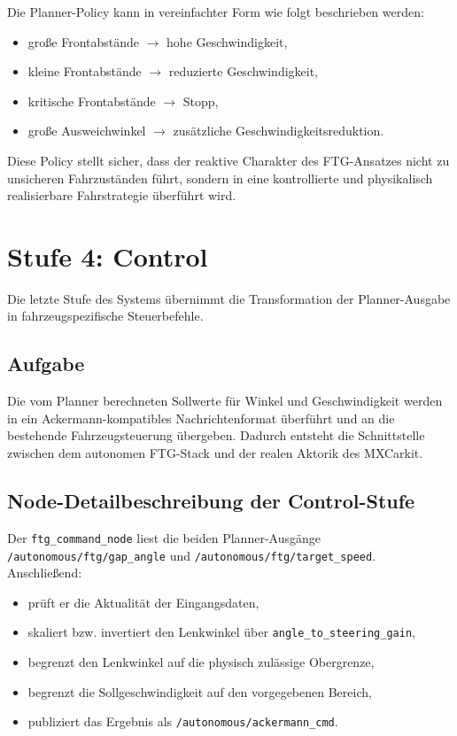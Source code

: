 Die Planner-Policy kann in vereinfachter Form wie folgt beschrieben werden:

\begin{itemize}
    \item große Frontabstände $\rightarrow$ hohe Geschwindigkeit,
    \item kleine Frontabstände $\rightarrow$ reduzierte Geschwindigkeit,
    \item kritische Frontabstände $\rightarrow$ Stopp,
    \item große Ausweichwinkel $\rightarrow$ zusätzliche Geschwindigkeitsreduktion.
\end{itemize}

Diese Policy stellt sicher, dass der reaktive Charakter des FTG-Ansatzes nicht zu unsicheren Fahrzuständen führt, sondern in eine kontrollierte und physikalisch realisierbare Fahrstrategie überführt wird.

\section{Stufe 4: Control}
\label{sec:control_stage}

Die letzte Stufe des Systems übernimmt die Transformation der Planner-Ausgabe in fahrzeugspezifische Steuerbefehle.

\subsection{Aufgabe}

Die vom Planner berechneten Sollwerte für Winkel und Geschwindigkeit werden in ein Ackermann-kompatibles Nachrichtenformat überführt und an die bestehende Fahrzeugsteuerung übergeben. Dadurch entsteht die Schnittstelle zwischen dem autonomen FTG-Stack und der realen Aktorik des MXCarkit.

\subsection{Node-Detailbeschreibung der Control-Stufe}

Der \texttt{ftg\_command\_node} liest die beiden Planner-Ausgänge \texttt{/autonomous/ftg/gap\_angle} und \texttt{/autonomous/ftg/target\_speed}. Anschließend:

\begin{itemize}
    \item prüft er die Aktualität der Eingangsdaten,
    \item skaliert bzw. invertiert den Lenkwinkel über \texttt{angle\_to\_steering\_gain},
    \item begrenzt den Lenkwinkel auf die physisch zulässige Obergrenze,
    \item begrenzt die Sollgeschwindigkeit auf den vorgegebenen Bereich,
    \item publiziert das Ergebnis als \texttt{/autonomous/ackermann\_cmd}.
\end{itemize}

